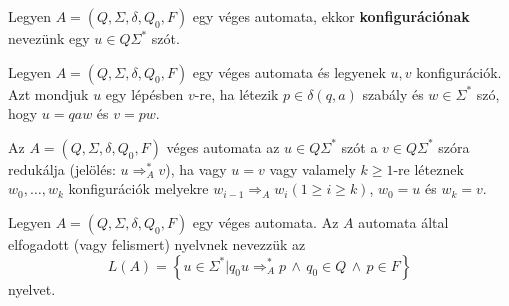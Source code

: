 \begin{definition*}[konfiguráció]
	Legyen $ A = \left( Q, \Sigma, \delta, Q_0, F \right) $ egy véges automata, ekkor \textbf{konfigurációnak} nevezünk egy $ u \in Q\Sigma^* $ szót.
\end{definition*}

\begin{definition*}
	Legyen $ A = \left( Q, \Sigma, \delta, Q_0, F \right) $ egy véges automata és legyenek $u, v$ konfigurációk. Azt mondjuk $u$ egy lépésben  $v$-re, ha létezik $ p \in \delta(q, a) $ szabály és $ w \in \Sigma^* $ szó, hogy $ u = qaw $ és $ v = pw $.
\end{definition*}

\begin{definition*}[redukció]
	Az $ A = \left( Q, \Sigma, \delta, Q_0, F \right) $ véges automata az $ u \in Q\Sigma^* $ szót a
	$ v \in Q\Sigma^* $ szóra redukálja (jelölés: $ u \Rightarrow_A^* v $), ha vagy $ u = v $ vagy
	valamely $ k \ge 1 $-re léteznek $w_0, \dots , w_k $ konfigurációk melyekre
	$ w_{i-1} \Rightarrow_A w_i (1 \ge i \ge k ) $, $ w_0 = u $ és $ w_k = v $.
\end{definition*}

\begin{definition*}
	Legyen $ A = \left( Q, \Sigma, \delta, Q_0, F \right) $ egy véges automata. Az $A$ automata által elfogadott (vagy felismert) nyelvnek nevezzük az
	\[
	L(A) = \left\lbrace u \in \Sigma^* | q_0u \Rightarrow_A^*p \, \land \, q_0 \in Q \, \land \, p \in F \right\rbrace 
	\]
	nyelvet. 
\end{definition*}
\newpage
